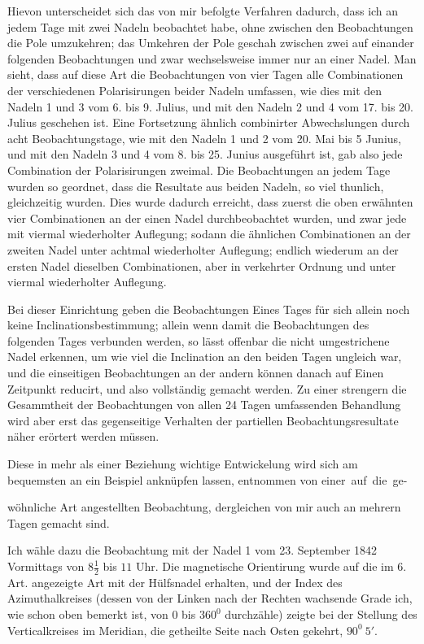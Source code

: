 Hievon unterscheidet sich das von mir befolgte Verfahren dadurch, dass ich an jedem Tage mit zwei Nadeln beobachtet habe, ohne zwischen den Beobachtungen die Pole umzukehren; das Umkehren der Pole geschah zwischen zwei auf einander folgenden Beobachtungen und zwar wechselsweise immer nur an einer Nadel. Man sieht, dass auf diese Art die Beobachtungen von vier Tagen alle Combinationen der verschiedenen Polarisirungen beider Nadeln umfassen, wie dies mit den Nadeln 1 und 3 vom 6. bis 9. Julius, und mit den Nadeln 2 und 4 vom 17. bis 20. Julius geschehen ist. Eine Fortsetzung ähnlich combinirter Abwechslungen durch acht Beobachtungstage, wie mit den Nadeln 1 und 2 vom 20. Mai bis 5 Junius, und mit den Nadeln 3 und 4 vom 8. bis 25. Junius ausgeführt ist, gab also jede Combination der Polarisirungen zweimal. Die Beobachtungen an jedem Tage wurden so geordnet, dass die Resultate aus beiden Nadeln, so viel thunlich, gleichzeitig wurden. Dies wurde dadurch erreicht, dass zuerst die oben erwähnten vier Combinationen an der einen Nadel durchbeobachtet wurden, und zwar jede mit viermal wiederholter Auflegung; sodann die ähnlichen Combinationen an der zweiten Nadel unter achtmal wiederholter Auflegung; endlich wiederum an der ersten Nadel dieselben Combinationen, aber in verkehrter Ordnung und unter viermal wiederholter Auflegung.

Bei dieser Einrichtung geben die Beobachtungen Eines Tages für sich allein noch keine Inclinationsbestimmung; allein wenn damit die Beobachtungen des folgenden Tages verbunden werden, so lässt offenbar die nicht umgestrichene Nadel erkennen, um wie viel die Inclination an den beiden Tagen ungleich war, und die einseitigen Beobachtungen an der andern können danach auf Einen Zeitpunkt reducirt, und also vollständig gemacht werden. Zu einer strengern die Gesammtheit der Beobachtungen von allen 24 Tagen umfassenden Behandlung wird aber erst das gegenseitige Verhalten der partiellen Beobachtungsresultate näher erörtert werden müssen.

Diese in mehr als einer Beziehung wichtige Entwickelung wird sich am bequemsten an ein Beispiel anknüpfen lassen, entnommen von einer~auf~die~ge-
\par\clearpage
{}
\noindent wöhnliche Art angestellten Beobachtung, dergleichen von mir auch an mehrern Tagen gemacht sind.

Ich wähle dazu die Beobachtung mit der Nadel 1 vom 23. September 1842 Vormittags von $8\frac{1}{2}$ bis $11$ Uhr. Die magnetische Orientirung wurde auf die im 6. Art. angezeigte Art mit der Hülfsnadel erhalten, und der Index des Azimuthalkreises (dessen von der Linken nach der Rechten wachsende Grade ich, wie schon oben bemerkt ist, von $0$ bis $360^0$ durchzähle) zeigte bei der Stellung des Verticalkreises im Meridian, die getheilte Seite nach Osten gekehrt, $90^0\ 5'$.

